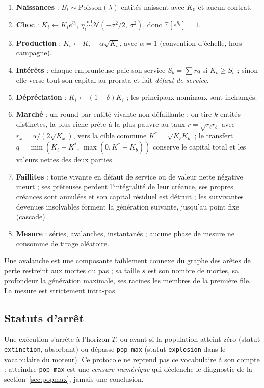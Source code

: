 \documentclass[11pt,a4paper]{article}
\newcommand{\code}[1]{\texttt{#1}}
\newcommand{\E}{\mathbb{E}}
\begin{document}
\begin{enumerate}
\item \textbf{Naissances} : $B_t\sim\mathrm{Poisson}(\lambda)$ entités
  naissent avec $K_0$ et aucun contrat.
\item \textbf{Choc} : $K_i \leftarrow K_i e^{\eta_i}$,
  $\eta_i \overset{\text{iid}}{\sim}
  \mathcal N(-\sigma^2/2,\,\sigma^2)$, donc $\E[e^{\eta_i}]=1$.
\item \textbf{Production} : $K_i \leftarrow K_i + \alpha\sqrt{K_i}$, avec
  $\alpha=1$ (convention d'échelle, hors campagne).
\item \textbf{Intérêts} : chaque emprunteuse paie son service
  $S_b=\sum r q$ si $K_b\ge S_b$ ; sinon elle verse tout son capital au
  prorata et fait \emph{défaut de service}.
\item \textbf{Dépréciation} : $K_i \leftarrow (1-\delta)K_i$ ; les
  principaux nominaux sont inchangés.
\item \textbf{Marché} : un round par entité vivante non défaillante ; on
  tire $k$ entités distinctes, la plus riche prête à la plus pauvre au taux
  $r=\sqrt{r_\ell r_b}$ avec $r_x = \alpha/(2\sqrt{K_x})$, vers la cible
  commune $K^\ast=\sqrt{K_\ell K_b}$ ; le transfert
  $q=\min(K_\ell-K^\ast,\,\max(0,K^\ast-K_b))$ conserve le capital total et
  les valeurs nettes des deux parties.
\item \textbf{Faillites} : toute vivante en défaut de service ou de valeur
  nette négative meurt ; ses prêteuses perdent l'intégralité de leur
  créance, ses propres créances sont annulées et son capital résiduel est
  détruit ; les survivantes devenues insolvables forment la génération
  suivante, jusqu'au point fixe (cascade).
\item \textbf{Mesure} : séries, avalanches, instantanés ; aucune phase de
  mesure ne consomme de tirage aléatoire.
\end{enumerate}

Une avalanche est une composante faiblement connexe du graphe des arêtes de
perte restreint aux mortes du pas ; sa taille $s$ est son nombre de mortes,
sa profondeur la génération maximale, ses racines les membres de la
première file. La mesure est strictement intra-pas.

\subsection{Statuts d'arrêt}

Une exécution s'arrête à l'horizon $T$, ou avant si la population atteint
zéro (statut \code{extinction}, absorbant) ou dépasse \code{pop\_max}
(statut \code{explosion} dans le vocabulaire du moteur). Ce protocole ne
reprend pas ce vocabulaire à son compte : atteindre \code{pop\_max} est une
\emph{censure numérique} qui déclenche le diagnostic de la
section~\ref{sec:popmax}, jamais une conclusion.
\end{document}
